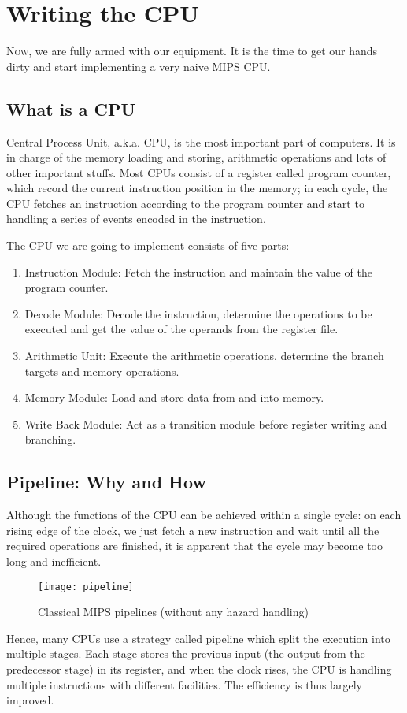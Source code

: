 \chapter{Writing the CPU}
\lettrine{N}{ow}, we are fully armed with our equipment. It is the time to get our hands dirty and start implementing a very naive MIPS CPU.
\section{What is a CPU}
Central Process Unit, a.k.a. CPU, is the most important part of computers. It is in charge of the memory loading and storing, arithmetic operations and lots of other important stuffs. Most CPUs consist of a register called program counter, which record the current instruction position in the memory; in each cycle, the CPU fetches an instruction according to the program counter and start to handling a series of events encoded in the instruction.

The CPU we are going to implement consists of five parts:
\begin{enumerate}
	\item Instruction Module: Fetch the instruction and maintain the value of the program counter.
	\item Decode Module: Decode the instruction, determine the operations to be executed and get the value of the operands from the register file.
	\item Arithmetic Unit: Execute the arithmetic operations, determine the branch targets and memory operations.
	\item Memory Module: Load and store data from and into memory.
	\item Write Back Module: Act as a transition module before register writing and branching. 
\end{enumerate}
\section{Pipeline: Why and How}
Although the functions of the CPU can be achieved within a single cycle: on each rising edge of the clock, we just fetch a new instruction and wait until all the required operations are finished, it is apparent that the cycle may become too long and inefficient. 
\begin{figure}[H]
	\centering
	\texttt{[image: pipeline]}
	\caption{Classical MIPS pipelines (without any hazard handling)}
\end{figure}
Hence, many CPUs use a strategy called pipeline which split the execution into multiple stages. Each stage stores the previous input (the output from the predecessor stage) in its register, and when the clock rises, the CPU is handling multiple instructions with different facilities. The efficiency is thus largely improved.

